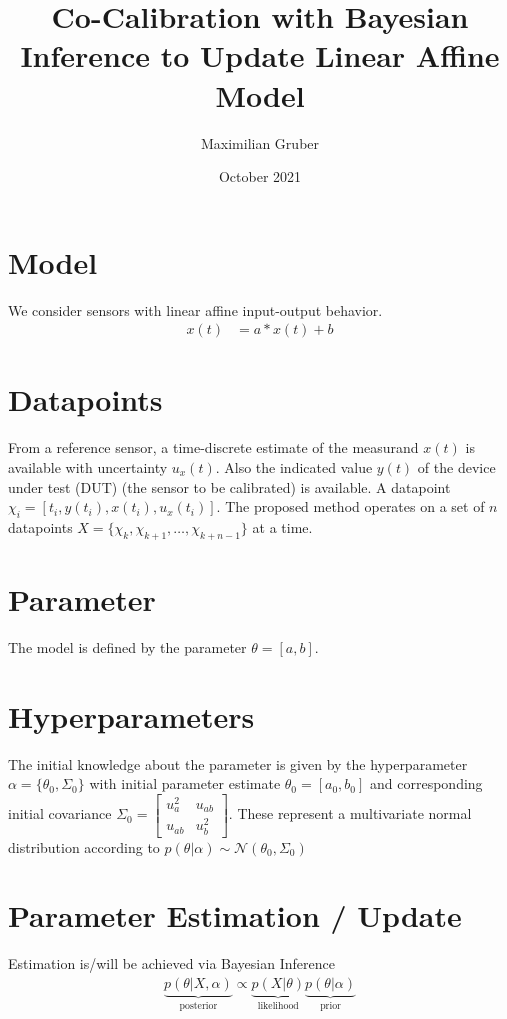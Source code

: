 \documentclass[10pt]{article}
\title{Co-Calibration with Bayesian Inference to Update Linear Affine Model}
\author{Maximilian Gruber}    %
\date{October 2021}
\begin{document}
    \maketitle
    \section{Model}
    We consider sensors with linear affine input-output behavior. 
    \begin{align}
        x(t) &= a*x(t) + b
    \end{align}
    
    \section{Datapoints}
    From a reference sensor, a time-discrete estimate of the measurand $x(t)$ is available with uncertainty $u_x(t)$. 
    Also the indicated value $y(t)$ of the device under test (DUT) (the sensor to be calibrated) is available. 
    A datapoint $\chi_i = [t_i, y(t_i), x(t_i), u_x(t_i)]$. 
    The proposed method operates on a set of $n$ datapoints $X = \{\chi_k, \chi_{k+1}, \dots,  \chi_{k+n-1}\}$ at a time.

    \section{Parameter}
        
    The model is defined by the parameter $\theta = [a, b]$. 
    
    \section{Hyperparameters}
    The initial knowledge about the parameter is given by the hyperparameter $\alpha = \{\theta_0, \Sigma_0\}$ with initial parameter estimate $\theta_0 = [a_0, b_0]$ and corresponding initial covariance $\Sigma_0 = \begin{bmatrix}u_a^2 & u_{ab} \\ u_{ab} & u_b^2\end{bmatrix} $.
    These represent a multivariate normal distribution according to $p(\theta | \alpha) \sim \mathcal{N}(\theta_0, \Sigma_0)$
    
    \section{Parameter Estimation / Update}
    Estimation is/will be achieved via Bayesian Inference
    \begin{align}
        \underbrace{p(\theta | X, \alpha)}_{\text{posterior}} \propto \underbrace{p(X | \theta)}_{\text{likelihood}} \underbrace{p(\theta | \alpha)}_{\text{prior}}
    \end{align}
    
\end{document}
